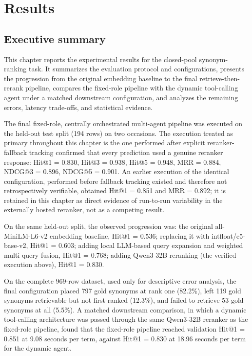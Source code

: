 \chapter{Results}
\label{chap:results}

\section{Executive summary}

This chapter reports the experimental results for the closed-pool synonym-ranking task. It summarizes the evaluation protocol and configurations, presents the progression from the original embedding baseline to the final retrieve-then-rerank pipeline, compares the fixed-role pipeline with the dynamic tool-calling agent under a matched downstream configuration, and analyzes the remaining errors, latency trade-offs, and statistical evidence.

The final fixed-role, centrally orchestrated multi-agent pipeline was executed on the held-out test split (194 rows) on two occasions. The execution treated as primary throughout this chapter is the one performed after explicit reranker-fallback tracking confirmed that every prediction used a genuine reranker response: Hit@1 = 0.830, Hit@3 = 0.938, Hit@5 = 0.948, MRR = 0.884, NDCG@3 = 0.896, NDCG@5 = 0.901. An earlier execution of the identical configuration, performed before fallback tracking existed and therefore not retrospectively verifiable, obtained Hit@1 = 0.851 and MRR = 0.892; it is retained in this chapter as direct evidence of run-to-run variability in the externally hosted reranker, not as a competing result.

On the same held-out split, the observed progression was: the original all-MiniLM-L6-v2 embedding baseline, Hit@1 = 0.536; replacing it with intfloat/e5-base-v2, Hit@1 = 0.603; adding local LLM-based query expansion and weighted multi-query fusion, Hit@1 = 0.768; adding Qwen3-32B reranking (the verified execution above), Hit@1 = 0.830.

On the complete 969-row dataset, used only for descriptive error analysis, the final configuration placed 797 gold synonyms at rank one (82.2\%), left 119 gold synonyms retrievable but not first-ranked (12.3\%), and failed to retrieve 53 gold synonyms at all (5.5\%). A matched downstream comparison, in which a dynamic tool-calling architecture was passed through the same Qwen3-32B reranker as the fixed-role pipeline, found that the fixed-role pipeline reached validation Hit@1 = 0.851 at 9.08 seconds per term, against Hit@1 = 0.830 at 18.96 seconds per term for the dynamic agent.

